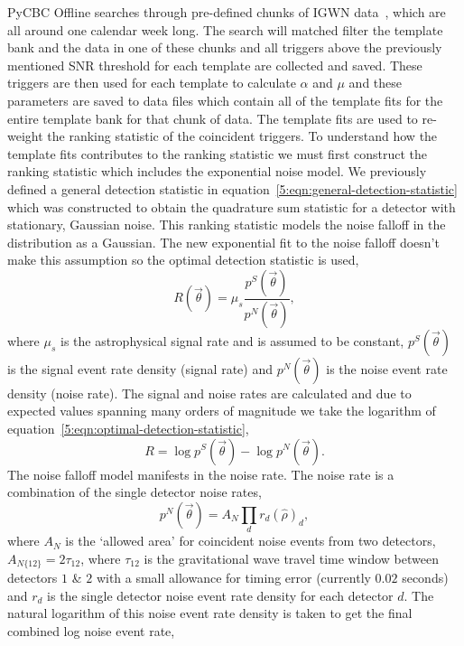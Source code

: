 PyCBC Offline searches through pre-defined chunks of IGWN data~\cite{gwtc3:2023}, which are all around one calendar week long. The search will matched filter the template bank and the data in one of these chunks and all triggers above the previously mentioned SNR threshold for each template are collected and saved. These triggers are then used for each template to calculate $\alpha$ and $\mu$ and these parameters are saved to data files which contain all of the template fits for the entire template bank for that chunk of data.
%
% 
The template fits are used to re-weight the ranking statistic of the coincident triggers. To understand how the template fits contributes to the ranking statistic we must first construct the ranking statistic which includes the exponential noise model. We previously defined a general detection statistic in equation~\ref{5:eqn:general-detection-statistic} which was constructed to obtain the quadrature sum statistic for a detector with stationary, Gaussian noise. This ranking statistic models the noise falloff in the distribution as a Gaussian. The new exponential fit to the noise falloff doesn't make this assumption so the optimal detection statistic is used,
%
\begin{equation}
    R(\Vec{\theta}) = \mu_{s} \frac{p^{S}(\Vec{\theta})}{p^{N}(\Vec{\theta})} ,
    \label{5:eqn:optimal-detection-statistic}
\end{equation}
where $\mu_{s}$ is the astrophysical signal rate and is assumed to be constant, $p^{S}(\Vec{\theta})$ is the signal event rate density (signal rate) and $p^{N}(\Vec{\theta})$ is the noise event rate density (noise rate). The signal and noise rates are calculated and due to expected values spanning many orders of magnitude we take the logarithm of equation~\ref{5:eqn:optimal-detection-statistic},
%
\begin{equation}
    R = \log p^{S}(\Vec{\theta}) - \log p^{N}(\Vec{\theta}).
    \label{5:eqn:signal-minus-noise-rate}
\end{equation}
The noise falloff model manifests in the noise rate. The noise rate is a combination of the single detector noise rates,
%
\begin{equation}
    p^{N}(\Vec{\theta}) = A_{N} \prod_{d} r_{d}(\hat{\rho})_{d} ,
\label{5:eqn:comb-noise-rate}
\end{equation}
%
where $A_{N}$ is the `allowed area' for coincident noise events from two detectors, $A_{N\{12\}} = 2\tau_{12}$, where $\tau_{12}$ is the gravitational wave travel time window between detectors $1$ \& $2$ with a small allowance for timing error (currently $0.02$ seconds) and $r_{d}$ is the single detector noise event rate density for each detector $d$. The natural logarithm of this noise event rate density is taken to get the final combined log noise event rate,
